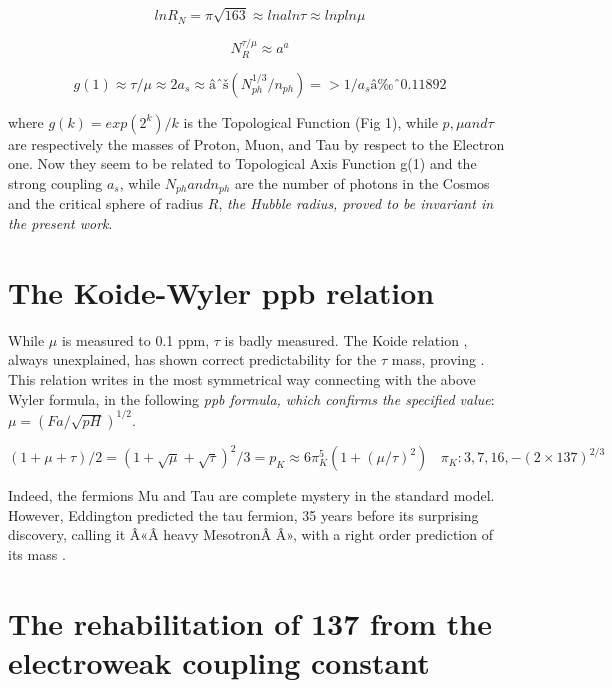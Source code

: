 \documentclass[a4paper,9pt]{article}
\begin{document}
\begin{equation}
lnR_N = \pi \sqrt{163}  \approx lna ln\tau  \approx  lnp ln\mu
\end{equation}

\begin{equation}
N_R^{\tau/\mu}  \approx a^a
\end{equation}

\begin{equation}
g(1)  \approx \tau/\mu  \approx  2a_s \approx  âˆš(N_{ph}^{1/3}/n_{ph})             =>              1/a_s â‰ˆ  0.11892
\end{equation}

where $g(k) = exp(2^k)/k$ is the Topological Function (Fig 1), while $p, \mu and \tau$ are respectively the masses of Proton, Muon, and Tau by respect to the Electron one.  Now they seem to be related to Topological Axis Function g(1) and the strong coupling $a_s$, while  $N_{ph} and n_{ph}$  are the number of photons in the Cosmos and the critical sphere of radius $R$, \textit{the Hubble radius, proved to be invariant in the present work}.


\section {The Koide-Wyler ppb relation}

While $\mu$ is measured to 0.1 ppm, $\tau$ is badly measured. The Koide relation \cite{Koide}, always unexplained, has shown correct predictability for the $\tau$ mass, proving . This relation writes in the most symmetrical way connecting with the above Wyler formula, in the following \textit{ppb formula, which confirms the specified  value}: $\mu = (Fa/\sqrt{pH})^{1/2}$\cite{Sanchez}.


\begin{equation}
(1 + \mu + \tau)/2 = (1 + \sqrt{\mu} + \sqrt{\tau})^2/3 = p_K \approx 6\pi_K^5 (1+(\mu / \tau)^2) ~~~~\pi_K: 3,7,16,-(2\times 137)^{2/3}
\end{equation}

Indeed, the fermions Mu and Tau are complete mystery in the standard model. However, Eddington predicted the tau fermion, 35 years before its surprising discovery, calling it Â«Â heavy MesotronÂ Â», with a right order prediction of its mass \cite{Eddington}.

\section{The rehabilitation of 137 from the electroweak coupling constant}
\end{document}
